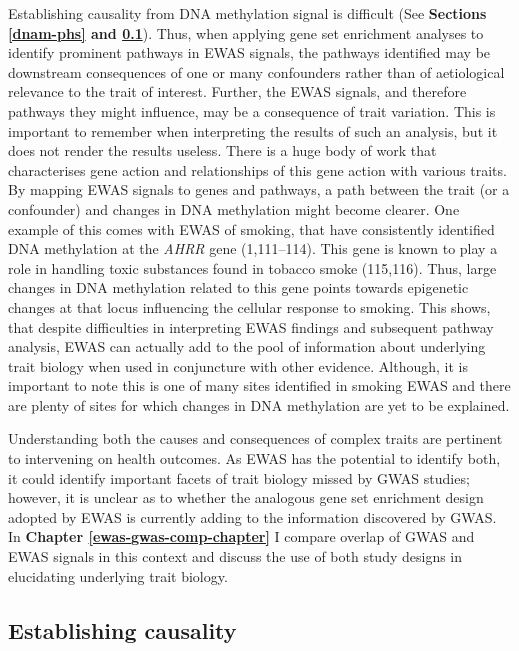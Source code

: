 \documentclass[11pt,twoside]{bristolthesis}
\begin{document}
Establishing causality from DNA methylation signal is difficult (See \textbf{Sections \ref{dnam-phs} and \ref{establishing-causality}}). Thus, when applying gene set enrichment analyses to identify prominent pathways in EWAS signals, the pathways identified may be downstream consequences of one or many confounders rather than of aetiological relevance to the trait of interest. Further, the EWAS signals, and therefore pathways they might influence, may be a consequence of trait variation. This is important to remember when interpreting the results of such an analysis, but it does not render the results useless. There is a huge body of work that characterises gene action and relationships of this gene action with various traits. By mapping EWAS signals to genes and pathways, a path between the trait (or a confounder) and changes in DNA methylation might become clearer. One example of this comes with EWAS of smoking, that have consistently identified DNA methylation at the \emph{AHRR} gene (1,111--114). This gene is known to play a role in handling toxic substances found in tobacco smoke (115,116). Thus, large changes in DNA methylation related to this gene points towards epigenetic changes at that locus influencing the cellular response to smoking. This shows, that despite difficulties in interpreting EWAS findings and subsequent pathway analysis, EWAS can actually add to the pool of information about underlying trait biology when used in conjuncture with other evidence. Although, it is important to note this is one of many sites identified in smoking EWAS and there are plenty of sites for which changes in DNA methylation are yet to be explained.

Understanding both the causes and consequences of complex traits are pertinent to intervening on health outcomes. As EWAS has the potential to identify both, it could identify important facets of trait biology missed by GWAS studies; however, it is unclear as to whether the analogous gene set enrichment design adopted by EWAS is currently adding to the information discovered by GWAS. In \textbf{Chapter \ref{ewas-gwas-comp-chapter}} I compare overlap of GWAS and EWAS signals in this context and discuss the use of both study designs in elucidating underlying trait biology.

\hypertarget{establishing-causality}{%
\subsection{Establishing causality}\label{establishing-causality}}
\end{document}
